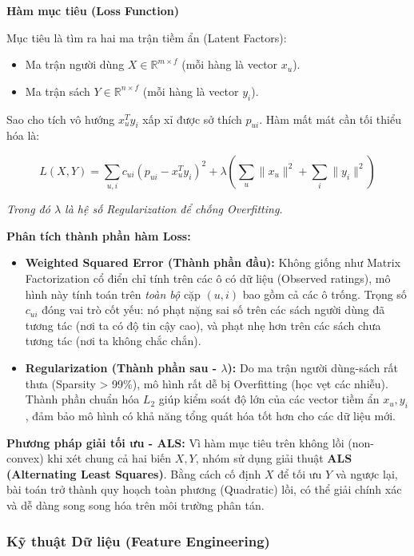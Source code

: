 \textbf{Hàm mục tiêu (Loss Function)}

Mục tiêu là tìm ra hai ma trận tiềm ẩn (Latent Factors):
\begin{itemize}
    \item Ma trận người dùng $X \in \mathbb{R}^{m \times f}$ (mỗi hàng là vector $x_u$).
    \item Ma trận sách $Y \in \mathbb{R}^{n \times f}$ (mỗi hàng là vector $y_i$).
\end{itemize}

Sao cho tích vô hướng $x_u^T y_i$ xấp xỉ được sở thích $p_{ui}$. Hàm mất mát cần tối thiểu hóa là:

\begin{equation}
    L(X, Y) = \sum_{u, i} c_{ui} (p_{ui} - x_u^T y_i)^2 + \lambda \left( \sum_u \|x_u\|^2 + \sum_i \|y_i\|^2 \right)
\end{equation}

\textit{Trong đó $\lambda$ là hệ số Regularization để chống Overfitting.}

\textbf{Phân tích thành phần hàm Loss:}
\begin{itemize}
    \item \textbf{Weighted Squared Error (Thành phần đầu):} Không giống như Matrix Factorization cổ điển chỉ tính trên các ô có dữ liệu (Observed ratings), mô hình này tính toán trên \textit{toàn bộ} cặp $(u, i)$ bao gồm cả các ô trống. Trọng số $c_{ui}$ đóng vai trò cốt yếu: nó phạt nặng sai số trên các sách người dùng đã tương tác (nơi ta có độ tin cậy cao), và phạt nhẹ hơn trên các sách chưa tương tác (nơi ta không chắc chắn).
    \item \textbf{Regularization (Thành phần sau - $\lambda$):} Do ma trận người dùng-sách rất thưa (Sparsity > 99\%), mô hình rất dễ bị Overfitting (học vẹt các nhiễu). Thành phần chuẩn hóa $L_2$ giúp kiểm soát độ lớn của các vector tiềm ẩn $x_u, y_i$, đảm bảo mô hình có khả năng tổng quát hóa tốt hơn cho các dữ liệu mới.
\end{itemize}

\textbf{Phương pháp giải tối ưu - ALS:}
Vì hàm mục tiêu trên không lồi (non-convex) khi xét chung cả hai biến $X, Y$, nhóm sử dụng giải thuật \textbf{ALS (Alternating Least Squares)}. Bằng cách cố định $X$ để tối ưu $Y$ và ngược lại, bài toán trở thành quy hoạch toàn phương (Quadratic) lồi, có thể giải chính xác và dễ dàng song song hóa trên môi trường phân tán.


\subsubsection{Kỹ thuật Dữ liệu (Feature Engineering)}


